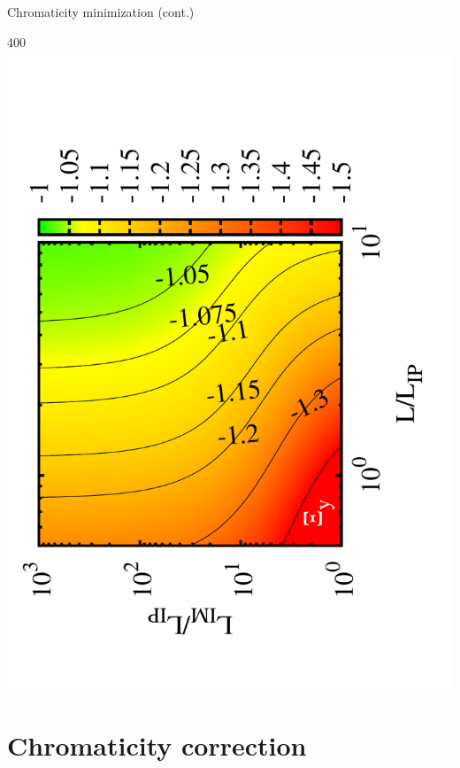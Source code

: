 \documentclass{beamer}
\begin{document}
\begin{frame}{Chromaticity minimization (cont.)}
\begin{textblock}{400}
 \includegraphics[scale=0.20,angle=-90]{Xi_ya.pdf}
\end{textblock}
\end{frame}
\section{Chromaticity correction}
\end{document}
